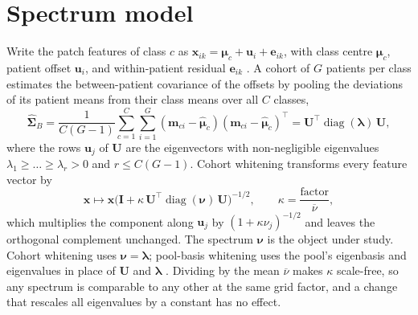 \documentclass[11pt]{article}
\begin{document}
\section{Spectrum model}
\label{sec:model}
Write the patch features of class $c$ as $\mathbf x_{ik}=\boldsymbol\mu_c+\mathbf u_i+\mathbf e_{ik}$, with class centre $\boldsymbol\mu_c$, patient offset $\mathbf u_i$, and within-patient residual $\mathbf e_{ik}$ \citep{queisler2026centreError}. A cohort of $G$ patients per class estimates the between-patient covariance of the offsets by pooling the deviations of its patient means from their class means over all $C$ classes,
\begin{equation}
  \hat{\boldsymbol\Sigma}_B=\frac{1}{C(G-1)}\sum_{c=1}^{C}\sum_{i=1}^{G}(\mathbf m_{ci}-\hat{\boldsymbol\mu}_c)(\mathbf m_{ci}-\hat{\boldsymbol\mu}_c)^\top
  =\mathbf U^\top\operatorname{diag}(\boldsymbol\lambda)\,\mathbf U ,
  \label{eq:cov}
\end{equation}
\noindent where the rows $\mathbf u_j$ of $\mathbf U$ are the eigenvectors with non-negligible eigenvalues $\lambda_1\geq\dots\geq\lambda_r>0$ and $r\leq C(G-1)$. Cohort whitening transforms every feature vector by
\begin{equation}
  \mathbf x\mapsto\mathbf x\bigl(\mathbf I+\kappa\,\mathbf U^\top\operatorname{diag}(\boldsymbol\nu)\,\mathbf U\bigr)^{-1/2},
  \qquad
  \kappa=\frac{\text{factor}}{\overline{\nu}},
  \label{eq:whiten}
\end{equation}
\noindent which multiplies the component along $\mathbf u_j$ by $(1+\kappa\nu_j)^{-1/2}$ and leaves the orthogonal complement unchanged. The spectrum $\boldsymbol\nu$ is the object under study. Cohort whitening uses $\boldsymbol\nu=\boldsymbol\lambda$; pool-basis whitening uses the pool's eigenbasis and eigenvalues in place of $\mathbf U$ and $\boldsymbol\lambda$ \citep{queisler2026patientDirections}. Dividing by the mean $\overline{\nu}$ makes $\kappa$ scale-free, so any spectrum is comparable to any other at the same grid factor, and a change that rescales all eigenvalues by a constant has no effect.
\end{document}
